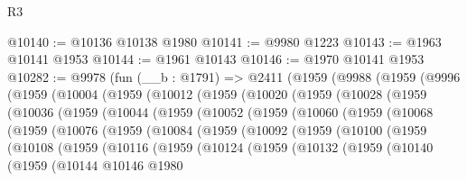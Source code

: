 \begin{lexlean}{R3}
\begin{coremodule}
@10140 := @10136 @10138 @1980
@10141 := @9980 @1223
@10143 := @1963 @10141 @1953
@10144 := @1961 @10143
@10146 := @1970 @10141 @1953
@10282 := @9978
    (fun (__b : @1791) =>
    @2411
      (@1959
        (@9988
          (@1959
            (@9996
              (@1959
                (@10004
                  (@1959
                    (@10012
                      (@1959
                        (@10020
                          (@1959
                            (@10028
                              (@1959
                                (@10036
                                  (@1959
                                    (@10044
                                      (@1959
                                        (@10052
                                          (@1959
                                            (@10060
                                              (@1959
                                                (@10068
                                                  (@1959
                                                    (@10076
                                                      (@1959
                                                        (@10084
                                                          (@1959
                                                            (@10092
                                                              (@1959
                                                                (@10100
                                                                  (@1959
                                                                    (@10108
                                                                      (@1959
                                                                        (@10116
                                                                          (@1959
                                                                            (@10124
                                                                              (@1959
                                                                                (@10132
                                                                                  (@1959
                                                                                    (@10140
                                                                                      (@1959
                                                                                        (@10144
                                                                                          @10146
                                                                                          @1980

\end{coremodule}
\end{lexlean}
